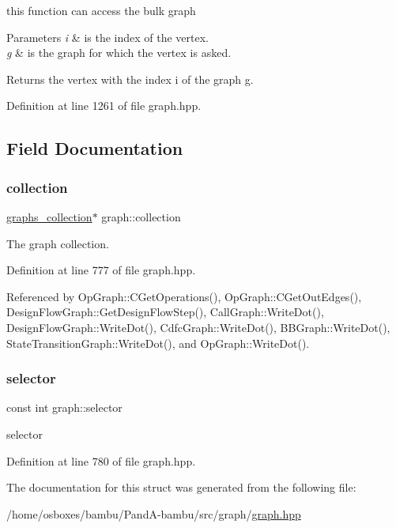 this function can access the bulk graph 


\begin{DoxyParams}{Parameters}
{\em i} & is the index of the vertex. \\
\hline
{\em g} & is the graph for which the vertex is asked. \\
\hline
\end{DoxyParams}
\begin{DoxyReturn}{Returns}
the vertex with the index i of the graph g. 
\end{DoxyReturn}


Definition at line 1261 of file graph.\+hpp.



\subsection{Field Documentation}
\mbox{\label{structgraph_a4a6a4f5312ba75fd870ef1e5779deabf}} 
\subsubsection{\texorpdfstring{collection}{collection}}
{\footnotesize\ttfamily \hyperlink{structgraphs__collection}{graphs\+\_\+collection}$\ast$ graph\+::collection\hspace{0.3cm}{\ttfamily [protected]}}



The graph collection. 



Definition at line 777 of file graph.\+hpp.



Referenced by Op\+Graph\+::\+C\+Get\+Operations(), Op\+Graph\+::\+C\+Get\+Out\+Edges(), Design\+Flow\+Graph\+::\+Get\+Design\+Flow\+Step(), Call\+Graph\+::\+Write\+Dot(), Design\+Flow\+Graph\+::\+Write\+Dot(), Cdfc\+Graph\+::\+Write\+Dot(), B\+B\+Graph\+::\+Write\+Dot(), State\+Transition\+Graph\+::\+Write\+Dot(), and Op\+Graph\+::\+Write\+Dot().

\mbox{\label{structgraph_ab06c362711200ca8c15e3d85fef7957b}} 
\subsubsection{\texorpdfstring{selector}{selector}}
{\footnotesize\ttfamily const int graph\+::selector\hspace{0.3cm}{\ttfamily [protected]}}



selector 



Definition at line 780 of file graph.\+hpp.



The documentation for this struct was generated from the following file\+:\begin{DoxyCompactItemize}
\item 
/home/osboxes/bambu/\+Pand\+A-\/bambu/src/graph/\hyperlink{graph_8hpp}{graph.\+hpp}\end{DoxyCompactItemize}
